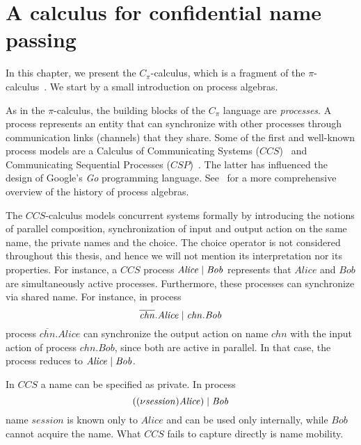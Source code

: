 \chapter{A calculus for confidential name passing}\label{chapter:Cpi}



In this chapter, we present the $C_\pi$-calculus, which is a fragment of the $\pi$-calculus~\cite{DBLP:books/daglib/0098267, DBLP:journals/iandc/MilnerPW92a, DBLP:journals/iandc/MilnerPW92b,  pi_calculus}.  
We start by a small introduction on process algebras. %

As in the $\pi$-calculus, the building blocks of the $C_\pi$ language are \emph{processes}. 
A process represents an entity that can synchronize with other processes through communication links (channels) that they share.
Some of the first and well-known process models are a Calculus of Communicating Systems ($CCS$)~\cite{DBLP:books/sp/Milner80} and Communicating Sequential Processes ($CSP$)~\cite{DBLP:books/ph/Hoare85}. 
The latter has influenced the design of Google's \emph{Go} programming language. 
See~\cite{DBLP:journals/tcs/Baeten05} for a more comprehensive overview of the history of process algebras.

The $CCS$-calculus models concurrent systems formally by introducing the notions of parallel composition, synchronization of input and output action on the same name, the private names and the choice. The choice operator is not considered throughout this thesis, and hence we will not mention its interpretation nor its properties.
For instance, a $CCS$ process $\mathit{Alice} \;|\; \mathit{Bob}$ represents that $\mathit{Alice}$ and $\mathit{Bob}$ are simultaneously active processes. Furthermore, these processes can synchronize via shared name. For instance, in process
\[
\overline{\mathit{chn}}.\mathit{Alice} \;|\; {\mathit{chn}}.\mathit{Bob}
\] 
process $\overline{\mathit{chn}}.\mathit{Alice}$ can synchronize the output action on name $\mathit{chn}$ with the input action of process ${\mathit{chn}}.\mathit{Bob}$, since both are active in parallel. In that case, the process reduces to $\mathit{Alice} \;|\; \mathit{Bob}$.

In $CCS$ a name can be specified as private. In process 
\[
((\nu \mathit{session})\mathit{Alice}) \;|\; \mathit{Bob}
\]
name $\mathit{session}$ is known only to $\mathit{Alice}$ and can be used only internally, while $\mathit{Bob}$ cannot acquire the name. What $CCS$ fails to capture directly is name mobility.

